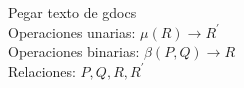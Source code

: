Pegar texto de gdocs\\
Operaciones unarias: $\mu(R) \rightarrow R^\prime$\\
Operaciones binarias: $\beta(P,Q) \rightarrow R$\\
Relaciones: $P,Q,R,R^\prime$